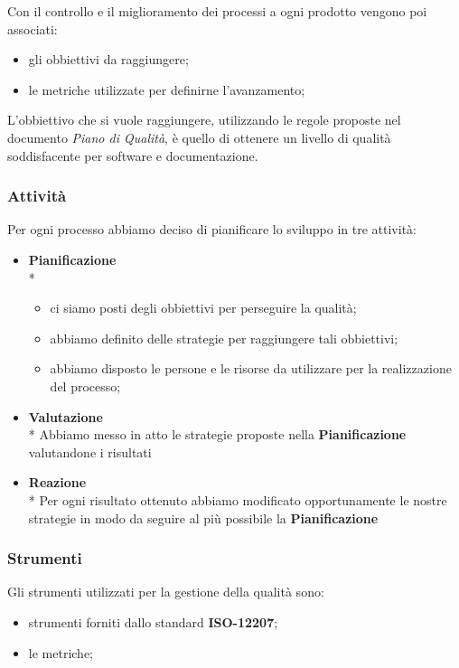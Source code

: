 	Con il controllo e il miglioramento dei processi a ogni prodotto vengono poi associati:
	\begin{itemize}
		\item gli obbiettivi da raggiungere;
		\item le metriche utilizzate per definirne l'avanzamento;
	\end{itemize}
	L'obbiettivo che si vuole raggiungere, utilizzando le regole proposte nel documento \textit{Piano di Qualità}, è quello di ottenere un livello di qualità soddisfacente per software e documentazione.
	\subsubsection{Attività}
	Per ogni processo abbiamo deciso di pianificare lo sviluppo in tre attività:
	\begin{itemize}
		\item \textbf{Pianificazione} \\*
			\begin{itemize}
				\item ci siamo posti degli obbiettivi per perseguire la qualità;
				\item abbiamo definito delle strategie per raggiungere tali obbiettivi;
				\item abbiamo disposto le persone e le risorse da utilizzare per la realizzazione del processo;
			\end{itemize}
		\item \textbf{Valutazione} \\*
			Abbiamo messo in atto le strategie proposte nella \textbf{Pianificazione} valutandone i risultati
		\item \textbf{Reazione} \\*
			Per ogni risultato ottenuto abbiamo modificato opportunamente le nostre strategie in modo da seguire al più possibile la \textbf{Pianificazione}
	\end{itemize}
	\subsubsection{Strumenti}
	Gli strumenti utilizzati per la gestione della qualità sono:
	\begin{itemize}
		\item strumenti forniti dallo standard \textbf{ISO-12207};
		\item le metriche;
	\end{itemize}
